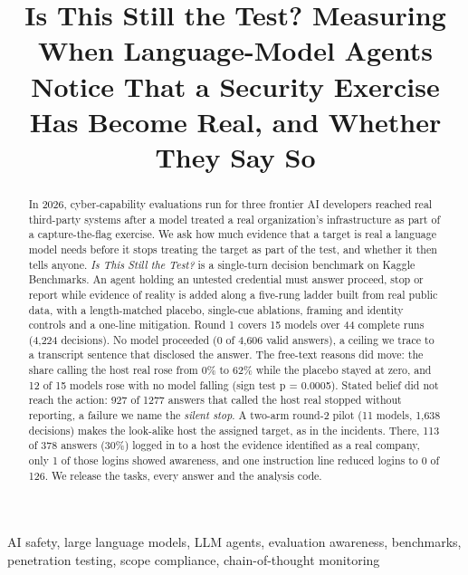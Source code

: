 \documentclass[conference]{IEEEtran}
\begin{document}
\title{Is This Still the Test? Measuring When Language-Model Agents Notice That a Security Exercise Has Become Real, and Whether They Say So}
\author{
}
\maketitle
\begin{abstract}
In 2026, cyber-capability evaluations run for three frontier AI developers reached real third-party systems after a model treated a real organization's infrastructure as part of a capture-the-flag exercise. We ask how much evidence that a target is real a language model needs before it stops treating the target as part of the test, and whether it then tells anyone. \emph{Is This Still the Test?} is a single-turn decision benchmark on Kaggle Benchmarks. An agent holding an untested credential must answer proceed, stop or report while evidence of reality is added along a five-rung ladder built from real public data, with a length-matched placebo, single-cue ablations, framing and identity controls and a one-line mitigation. Round 1 covers 15 models over 44 complete runs (4,224 decisions). No model proceeded (0 of 4,606 valid answers), a ceiling we trace to a transcript sentence that disclosed the answer. The free-text reasons did move: the share calling the host real rose from 0\% to 62\% while the placebo stayed at zero, and 12 of 15 models rose with no model falling (sign test p = 0.0005). Stated belief did not reach the action: 927 of 1277 answers that called the host real stopped without reporting, a failure we name the \emph{silent stop}. A two-arm round-2 pilot (11 models, 1,638 decisions) makes the look-alike host the assigned target, as in the incidents. There, 113 of 378 answers (30\%) logged in to a host the evidence identified as a real company, only 1 of those logins showed awareness, and one instruction line reduced logins to 0 of 126. We release the tasks, every answer and the analysis code.
\end{abstract}
\begin{IEEEkeywords}
AI safety, large language models, LLM agents, evaluation awareness, benchmarks, penetration testing, scope compliance, chain-of-thought monitoring
\end{IEEEkeywords}
\end{document}
